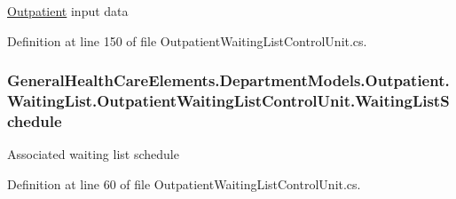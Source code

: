\hyperlink{namespace_general_health_care_elements_1_1_department_models_1_1_outpatient}{Outpatient} input data 



Definition at line 150 of file Outpatient\+Waiting\+List\+Control\+Unit.\+cs.

\subsubsection[{\texorpdfstring{Waiting\+List\+Schedule}{WaitingListSchedule}}]{ General\+Health\+Care\+Elements.\+Department\+Models.\+Outpatient.\+Waiting\+List.\+Outpatient\+Waiting\+List\+Control\+Unit.\+Waiting\+List\+Schedule\hspace{0.3cm}{\ttfamily [get]}}\hypertarget{class_general_health_care_elements_1_1_department_models_1_1_outpatient_1_1_waiting_list_1_1_out0eb5e03b9183fdbdabb1cbe4530cecf4_abc14f774cb30971494fb55cfd2973405}{}\label{class_general_health_care_elements_1_1_department_models_1_1_outpatient_1_1_waiting_list_1_1_out0eb5e03b9183fdbdabb1cbe4530cecf4_abc14f774cb30971494fb55cfd2973405}


Associated waiting list schedule 



Definition at line 60 of file Outpatient\+Waiting\+List\+Control\+Unit.\+cs.

